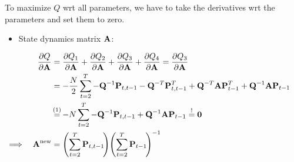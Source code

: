 	To maximize \(Q\) \ac{wrt} all parameters, we have to take the derivatives \ac{wrt} the parameters and set them to zero.
	\begin{itemize}
		\item State dynamics matrix \(\boldsymbol{\mathrm{A}}\):
	\end{itemize}
	\begin{align}
		&&\pdv{Q}{\mat{A}}
			&= \pdv{Q_1}{\mat{A}} + \pdv{Q_2}{\mat{A}} + \pdv{Q_3}{\mat{A}} + \pdv{Q_4}{\mat{A}} = \pdv{Q_3}{\mat{A}} & \nonumber \\
		&&	&= -\frac{N}{2} \sum_{t = 2}^{T} -\mat{Q}^{-1} \mat{P}_{t, t - 1} - \mat{Q}^{-T} \mat{P}_{t, t - 1}^T + \mat{Q}^{-T} \mat{A} \mat{P}_{t - 1}^T + \mat{Q}^{-1} \mat{A} \mat{P}_{t - 1} & \nonumber \\
		&&	&\oversetfootnotemark{=} -N \sum_{t = 2}^{T} -\mat{Q}^{-1} \mat{P}_{t, t - 1} + \mat{Q}^{-1} \mat{A} \mat{P}_{t - 1} \overset{!}{=} \mat{0} & \nonumber \\
		\implies && \mat{A}^\new &= \Bigg(\! \sum_{t = 2}^{T} \mat{P}_{t, t - 1} \!\Bigg) \Bigg(\! \sum_{t = 2}^{T} \mat{P}_{t - 1} \!\Bigg)^{-1} & \label{eq:stateDynamicsMatrix}
	\end{align}


